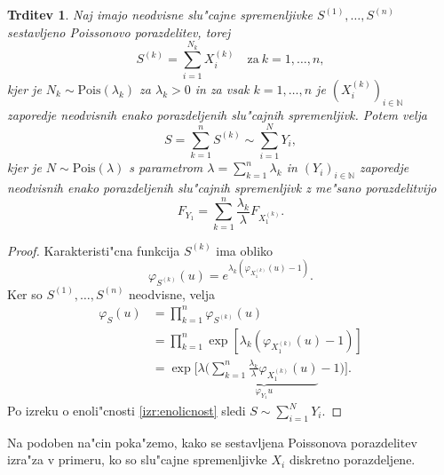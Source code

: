 \documentclass[12pt, a4paper, reqno]{amsart}
\theoremstyle{definition}
\theoremstyle{plain}
\newtheorem{trditev}[definicija]{Trditev}
\newcommand{\N}{\mathbb{N}}
\newcommand{\1}{\mathds{1}}
\newcommand{\Pois}[1]{\text{Pois}(#1)}
\newcommand*{\refPriloga}[1]{%
  \begingroup
    \hypersetup{
      linkcolor=red,
      linkbordercolor=red,
    }%
    \ref{#1}%
  \endgroup
}
\begin{document}
    \begin{trditev}
        Naj imajo neodvisne slu"cajne spremenljivke $S^{(1)}, \dots, S^{(n)}$ sestavljeno Poissonovo porazdelitev, torej 
        \begin{equation*}
            S^{(k)} = \sum_{i=1}^{N_k}X_i^{(k)} \quad \text{za} \ k=1, \dots, n,
        \end{equation*}
        kjer je $N_k\sim \Pois{\lambda_k}$ za $\lambda_k > 0$ in za vsak $k = 1, \dots, n$ je $(X_i^{(k)})_{i\in\N}$ 
        zaporedje neodvisnih enako porazdeljenih slu"cajnih spremenljivk. Potem velja   
        \begin{equation*}
            S = \sum_{k=1}^nS^{(k)} \sim \sum_{i=1}^{N}Y_i,
        \end{equation*}
        kjer je $N\sim\Pois{\lambda}$ s parametrom $\lambda = \sum_{k=1}^n\lambda_k$ in $(Y_i)_{i\in\N}$ zaporedje
        neodvisnih enako porazdeljenih slu"cajnih spremenljivk z me"sano porazdelitvijo
        \begin{equation*}
        F_{Y_1} = \sum_{k=1}^n\frac{\lambda_k}{\lambda}F_{X_1^{(k)}}.
        \end{equation*}
        \label{trd:vsotaCPDjeCPD}
    \end{trditev}

    \begin{proof}
        Karakteristi"cna funkcija $S^{(k)}$ ima obliko
        \begin{equation*}
            \varphi_{S^{(k)}}(u) = e^{\lambda_k\left(\varphi_{X_1^{(k)}}(u) - 1\right)}.
        \end{equation*}
        Ker so $S^{(1)}, \dots, S^{(n)}$ neodvisne, velja
        \begin{align*}
            \varphi_{S}(u) 
                &= \prod_{k=1}^n\varphi_{S^{(k)}}(u) \\
                &= \prod_{k=1}^n\exp\left[\lambda_k\left(\varphi_{X_1^{(k)}}(u) - 1\right)\right] \\
                &= \exp\Biggl[\lambda\Biggl(\underbrace{\sum_{k=1}^n \frac{\lambda_k}{\lambda} \varphi_{X_1^{(k)}}(u)}_{\varphi_{Y_1}{u}} - 1\Biggr)\Biggr].
        \end{align*}
        Po izreku o 
        enoli"cnosti \refPriloga{izr:enolicnost} sledi $S\sim\sum_{i=1}^{N}Y_i$.
    \end{proof}

    Na podoben na"cin poka"zemo, kako se sestavljena Poissonova porazdelitev izra"za v primeru, ko so
    slu"cajne spremenljivke $X_i$ diskretno porazdeljene.
\end{document}
